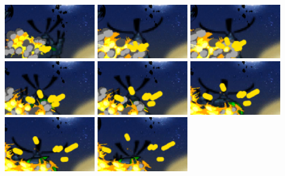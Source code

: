 \documentclass[10pt]{book}
\begin{document}
\begin{CJK}{UTF8}{gkai}
\begin{center}
\includegraphics[width=0.3\textwidth]{assets/ns-lines-0000.png}
\includegraphics[width=0.3\textwidth]{assets/ns-lines-0001.png}
\includegraphics[width=0.3\textwidth]{assets/ns-lines-0002.png}
\includegraphics[width=0.3\textwidth]{assets/ns-lines-0003.png}
\includegraphics[width=0.3\textwidth]{assets/ns-lines-0004.png}
\includegraphics[width=0.3\textwidth]{assets/ns-lines-0005.png}
\includegraphics[width=0.3\textwidth]{assets/ns-lines-0006.png}
\includegraphics[width=0.3\textwidth]{assets/ns-lines-0007.png}

\end{center}
\end{CJK}
\end{document}
